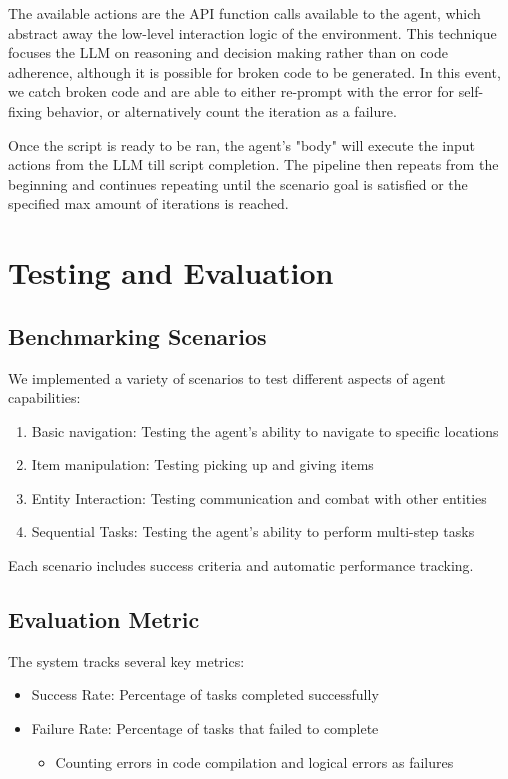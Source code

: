 \documentclass{article}
\begin{document}
The available actions are the API function calls available to the agent, which abstract away the low-level interaction logic of the environment.
This technique focuses the LLM on reasoning and decision making rather than on code adherence, although it is possible for broken code to be generated.
In this event, we catch broken code and are able to either re-prompt with the error for self-fixing behavior, or alternatively count the iteration as a failure.

Once the script is ready to be ran, the agent's "body" will execute the input actions from the LLM till script completion.
The pipeline then repeats from the beginning and continues repeating until the scenario goal is satisfied or the specified max amount of iterations is reached.

\section{Testing and Evaluation}
\subsection{Benchmarking Scenarios}

We implemented a variety of scenarios to test different aspects of agent capabilities:
\begin{enumerate}
    \item Basic navigation: Testing the agent's ability to navigate to specific locations
    \item Item manipulation: Testing picking up and giving items
    \item Entity Interaction: Testing communication and combat with other entities
    \item Sequential Tasks: Testing the agent's ability to perform multi-step tasks
\end{enumerate}
Each scenario includes success criteria and automatic performance tracking.

\subsection{ Evaluation Metric}
The system tracks several key metrics:
\begin{itemize}
    \item Success Rate: Percentage of tasks completed successfully
    \item Failure Rate: Percentage of tasks that failed to complete
          \begin{itemize}
              \item Counting errors in code compilation and logical errors as failures
          \end{itemize}
\end{itemize}
\end{document}
